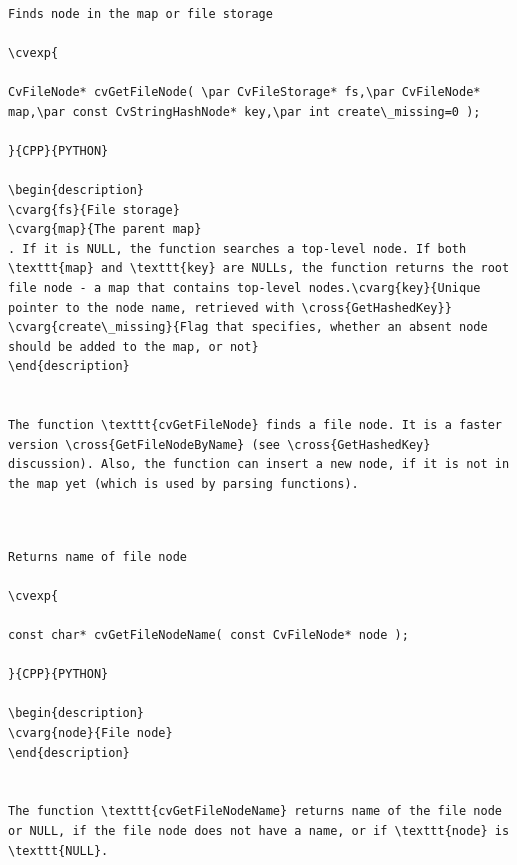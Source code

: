 \label{GetFileNode}
\begin{verbatim}

Finds node in the map or file storage

\cvexp{

CvFileNode* cvGetFileNode( \par CvFileStorage* fs,\par CvFileNode* map,\par const CvStringHashNode* key,\par int create\_missing=0 );

}{CPP}{PYTHON}

\begin{description}
\cvarg{fs}{File storage}
\cvarg{map}{The parent map}
. If it is NULL, the function searches a top-level node. If both \texttt{map} and \texttt{key} are NULLs, the function returns the root file node - a map that contains top-level nodes.\cvarg{key}{Unique pointer to the node name, retrieved with \cross{GetHashedKey}}
\cvarg{create\_missing}{Flag that specifies, whether an absent node should be added to the map, or not}
\end{description}


The function \texttt{cvGetFileNode} finds a file node. It is a faster version \cross{GetFileNodeByName} (see \cross{GetHashedKey} discussion). Also, the function can insert a new node, if it is not in the map yet (which is used by parsing functions).


\end{verbatim}
\label{GetFileNodeName}
\begin{verbatim}

Returns name of file node

\cvexp{

const char* cvGetFileNodeName( const CvFileNode* node );

}{CPP}{PYTHON}

\begin{description}
\cvarg{node}{File node}
\end{description}


The function \texttt{cvGetFileNodeName} returns name of the file node or NULL, if the file node does not have a name, or if \texttt{node} is \texttt{NULL}.


\end{verbatim}
\label{ReadInt}
